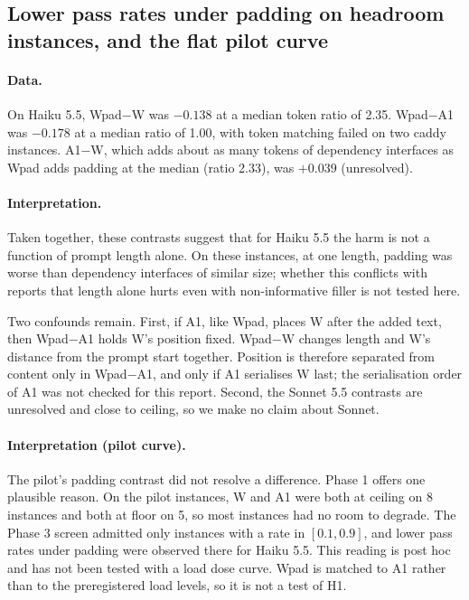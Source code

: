 \subsection{Lower pass rates under padding on headroom instances, and the flat pilot curve}

\paragraph{Data.} On Haiku 5.5, Wpad$-$W was $-0.138$ at a median token ratio of 2.35. Wpad$-$A1 was $-0.178$ at a median ratio of 1.00, with token matching failed on two caddy instances. A1$-$W, which adds about as many tokens of dependency interfaces as Wpad adds padding at the median (ratio 2.33), was $+0.039$ (unresolved).

\paragraph{Interpretation.} Taken together, these contrasts suggest that for Haiku 5.5 the harm is not a function of prompt length alone. On these instances, at one length, padding was worse than dependency interfaces of similar size; whether this conflicts with reports that length alone hurts even with non-informative filler \cite{du2025} is not tested here.

Two confounds remain. First, if A1, like Wpad, places W after the added text, then Wpad$-$A1 holds W's position fixed. Wpad$-$W changes length and W's distance from the prompt start together. Position \cite{liu2024} is therefore separated from content only in Wpad$-$A1, and only if A1 serialises W last; the serialisation order of A1 was not checked for this report. Second, the Sonnet 5.5 contrasts are unresolved and close to ceiling, so we make no claim about Sonnet.

\paragraph{Interpretation (pilot curve).} The pilot's padding contrast did not resolve a difference. Phase 1 offers one plausible reason. On the pilot instances, W and A1 were both at ceiling on 8 instances and both at floor on 5, so most instances had no room to degrade. The Phase 3 screen admitted only instances with a rate in $[0.1, 0.9]$, and lower pass rates under padding were observed there for Haiku 5.5. This reading is post hoc and has not been tested with a load dose curve. Wpad is matched to A1 rather than to the preregistered load levels, so it is not a test of H1.

